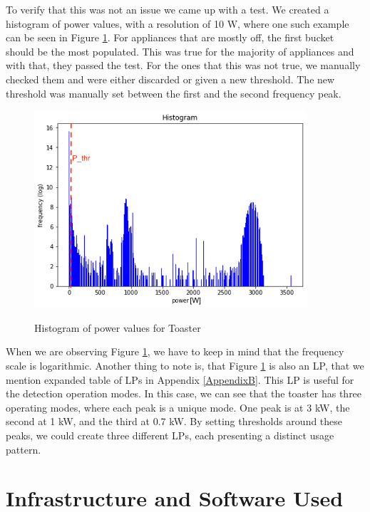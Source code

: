 To verify that this was not an issue we came up with a test.
We created a histogram of power values, with a resolution of 10 W, where one such example can be seen in Figure \ref{fig:freq_pthr}.
For appliances that are mostly off, the first bucket should be the most populated.
This was true for the majority of appliances and with that, they passed the test.
For the ones that this was not true, we manually checked them and were either discarded or given a new threshold.
The new threshold was manually set between the first and the second frequency peak. 

\begin{figure}[H]
	\centering
	\caption{Histogram of power values for Toaster}
	\includegraphics[width=0.9\textwidth]{Figures/profile_sketches/freq_pthr.png}
	\label{fig:freq_pthr}
\end{figure}

When we are observing Figure \ref{fig:freq_pthr}, we have to keep in mind that the frequency scale is logarithmic.
Another thing to note is, that Figure \ref{fig:freq_pthr} is also an LP, that we mention expanded table of LPs in Appendix \ref{AppendixB}.
This LP is useful for the detection operation modes.
In this case, we can see that the toaster has three operating modes, where each peak is a unique mode.
One peak is at 3 kW, the second at 1 kW, and the third at 0.7 kW.
By setting thresholds around these peaks, we could create three different LPs, each presenting a distinct usage pattern.

\section{Infrastructure and Software Used}

